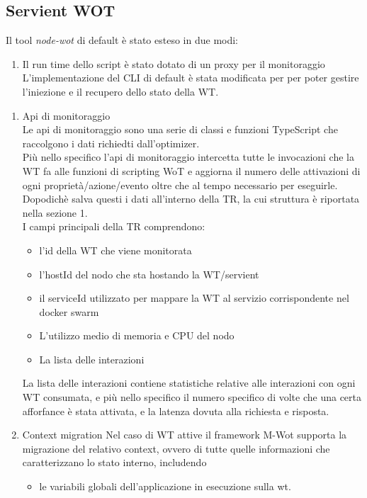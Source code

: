 \documentclass[11pt]{article}
\begin{document}
	\subsection{Servient WOT}
	Il tool \textit{node-wot} di default è stato esteso in due modi:
	\begin{enumerate}
		\item Il run time dello script è stato dotato di un proxy per il monitoraggio
		\text L'implementazione del CLI di default è stata modificata per per poter gestire l'iniezione e il recupero dello stato della WT.
	\end{enumerate}

	\begin{enumerate}
		\item Api di monitoraggio \\
		Le api di monitoraggio sono una serie di classi e funzioni TypeScript che raccolgono i dati richiedti dall'optimizer. \\
		Più nello specifico l'api di monitoraggio intercetta tutte le invocazioni che la WT fa alle funzioni di scripting WoT e aggiorna il numero delle attivazioni di ogni proprietà/azione/evento oltre che al tempo necessario per eseguirle. \\
		Dopodichè salva questi i dati all'interno della TR, la cui struttura è riportata nella sezione 1. \\
		I campi principali della TR comprendono:
		\begin{itemize}
			\item l'id della WT che viene monitorata
			\item l'hostId del nodo che sta hostando la WT/servient
			\item il serviceId utilizzato per mappare la WT al servizio corrispondente nel docker swarm
			\item L'utilizzo medio di memoria e CPU del nodo
			\item La lista delle interazioni
		\end{itemize}
		La lista delle interazioni contiene statistiche relative alle interazioni con ogni WT consumata, e più nello specifico il numero specifico di volte che una certa afforfance è stata attivata, e la latenza dovuta alla richiesta e risposta.
		\item Context migration
		Nel caso di WT attive il framework M-Wot supporta la migrazione del relativo context, ovvero di tutte quelle informazioni che caratterizzano lo stato interno, includendo 
		\begin{itemize}
			\item le variabili globali dell'applicazione in esecuzione sulla wt.

\end{itemize}
\end{enumerate}
\end{document}
